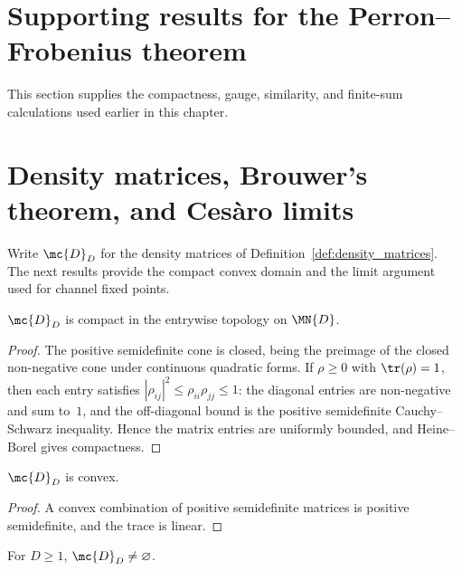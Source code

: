 \section{Supporting results for the Perron--Frobenius theorem}
\label{ch:qpf_supporting_results}
This section supplies the compactness, gauge, similarity, and finite-sum
calculations used earlier in this chapter.

\section{Density matrices, Brouwer's theorem, and Ces\`aro limits}
\label{sec:app_qpf_density}

Write $\mc{D}_D$ for the density matrices of
Definition~\ref{def:density_matrices}. The next results provide the compact
convex domain and the limit argument used for channel fixed points.

\begin{theorem}\label{thm:density_compact}
    \leanok
    $\mc{D}_D$ is compact in the entrywise topology on $\MN{D}$.
\end{theorem}

\begin{proof}
    \leanok
    The positive semidefinite cone is closed, being the preimage of the closed
    non-negative cone under continuous quadratic forms. If $\rho \ge 0$ with
    $\tr(\rho) = 1$, then each entry satisfies
    $|\rho_{ij}|^2 \le \rho_{ii}\rho_{jj} \le 1$: the diagonal entries are
    non-negative and sum to~$1$, and the off-diagonal bound is the positive
    semidefinite Cauchy--Schwarz inequality. Hence the matrix entries are
    uniformly bounded, and Heine--Borel gives compactness.
\end{proof}

\begin{theorem}\label{thm:density_convex}
    \leanok
    $\mc{D}_D$ is convex.
\end{theorem}

\begin{proof}\leanok
    A convex combination of positive semidefinite matrices is positive
    semidefinite, and the trace is linear.
\end{proof}

\begin{theorem}\label{thm:density_nonempty}
    \leanok
    For $D \ge 1$, $\mc{D}_D \neq \varnothing$.
\end{theorem}

